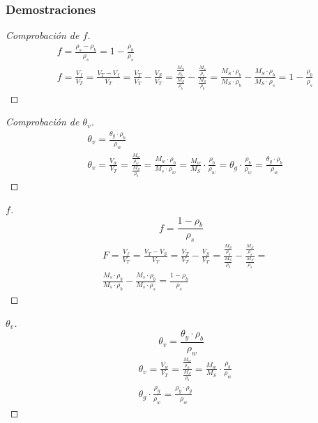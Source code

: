 \subsubsection{Demostraciones}
\begin{proof}[Comprobación de $f$]
    \begin{align*}
        &f =\frac{\rho_s -\rho_b}{\rho_s} = 1 -\frac{\rho_b}{\rho_s}\\
        &f = \frac{V_f}{V_T} =\frac{V_T - V_f}{V_T} =\frac{V_T}{V_T} -\frac{V_S}{V_T} =\frac{\frac{M_S}{\rho_b}}{\frac{M_S}{\rho_b}} -\frac{\frac{M_s}{\rho_s}}{\frac{M_S}{\rho_b}} =\frac{M_S\cdot \rho_b}{M_S\cdot \rho_b} -\frac{M_S\cdot \rho_b}{M_S\cdot \rho_s} = 1 -\frac{\rho_b}{\rho_s}
    \end{align*}
\end{proof}
\begin{proof}[Comprobación de $\theta_v$]
    \begin{align*}
        &\theta_v= \frac{\theta_g\cdot \rho_b}{\rho_w}\\
        &\theta_v =\frac{V_w}{V_T} =\frac{\frac{M_w}{\rho_w}}{\frac{M_S}{\rho_b}} =\frac{M_w\cdot \rho_b}{M_s\cdot \rho_w} =\frac{M_w}{M_S}\cdot \frac{\rho_b}{\rho_w} =\theta_g\cdot \frac{\rho_b}{\rho_w} = \frac{\theta_g\cdot \rho_b}{\rho_w}
    \end{align*}
\end{proof}
\begin{proof}[$f$]
    \begin{equation}
        f = \frac{1 -\rho_b}{\rho_s}
    \end{equation}
    \begin{align*}
        &F = \frac{V_f}{V_T} = \frac{V_T - V_S}{V_T} = \frac{V_T}{V_T} - \frac{V_S}{V_T} =\frac{\frac{M_S}{\rho_b}}{\frac{M_S}{\rho_b}} -\frac{\frac{M_S}{\rho_s}}{\frac{M_S}{\rho_s}} =\\
        &\frac{M_s \cdot \rho_b}{M_s \cdot \rho_b} -\frac{M_s \cdot \rho_b}{M_s \cdot \rho_s} =\frac{1 -\rho_b}{\rho_s}
    \end{align*}
\end{proof}

\begin{proof}[$\theta_v$]
    \begin{equation}
        \theta_v = \frac{\theta_y\cdot\rho_b}{\rho_w}
    \end{equation}
    \begin{align*}
        &\theta_v = \frac{V_w}{V_T} = \frac{\frac{M_w}{\rho_w}}{\frac{M_S}{\rho_b}} = \frac{M_w}{M_S}\cdot \frac{\rho_b}{\rho_w}\\
        &\theta_g \cdot \frac{\rho_g}{\rho_w} =\frac{\rho_y\cdot\rho_g}{\rho_w}
    \end{align*}
\end{proof}

